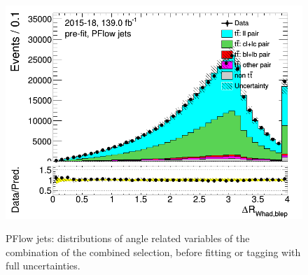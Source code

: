 \documentclass[letterpaper,12pt]{article}
\begin{document}
\begin{figure}[H]
	\includegraphics[width=.45\textwidth]{FTAG_plots/pretagNoRwwithhighpTPFlowall/DataMC_h_dRWhadblep.png} \\
	\caption{PFlow jets: distributions of angle related variables of the combination of the combined selection,
	 before fitting or 
	tagging with full uncertainties.} \label{fig:combined_angles_PFlow}
	\end{figure}
	
\end{document}
